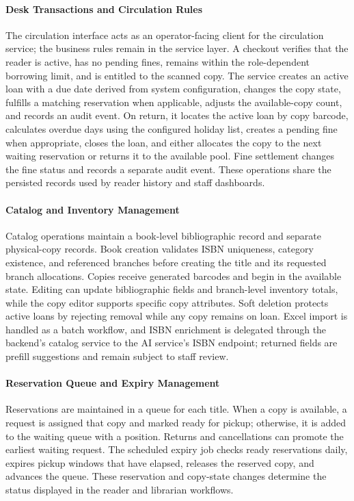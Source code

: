 \paragraph{Desk Transactions and Circulation Rules}
The circulation interface acts as an operator-facing client for the circulation service; the business rules remain in the service layer. A checkout verifies that the reader is active, has no pending fines, remains within the role-dependent borrowing limit, and is entitled to the scanned copy. The service creates an active loan with a due date derived from system configuration, changes the copy state, fulfills a matching reservation when applicable, adjusts the available-copy count, and records an audit event. On return, it locates the active loan by copy barcode, calculates overdue days using the configured holiday list, creates a pending fine when appropriate, closes the loan, and either allocates the copy to the next waiting reservation or returns it to the available pool. Fine settlement changes the fine status and records a separate audit event. These operations share the persisted records used by reader history and staff dashboards.

\paragraph{Catalog and Inventory Management}
Catalog operations maintain a book-level bibliographic record and separate physical-copy records. Book creation validates ISBN uniqueness, category existence, and referenced branches before creating the title and its requested branch allocations. Copies receive generated barcodes and begin in the available state. Editing can update bibliographic fields and branch-level inventory totals, while the copy editor supports specific copy attributes. Soft deletion protects active loans by rejecting removal while any copy remains on loan. Excel import is handled as a batch workflow, and ISBN enrichment is delegated through the backend's catalog service to the AI service's ISBN endpoint; returned fields are prefill suggestions and remain subject to staff review.

\paragraph{Reservation Queue and Expiry Management}
Reservations are maintained in a queue for each title. When a copy is available, a request is assigned that copy and marked ready for pickup; otherwise, it is added to the waiting queue with a position. Returns and cancellations can promote the earliest waiting request. The scheduled expiry job checks ready reservations daily, expires pickup windows that have elapsed, releases the reserved copy, and advances the queue. These reservation and copy-state changes determine the status displayed in the reader and librarian workflows.

